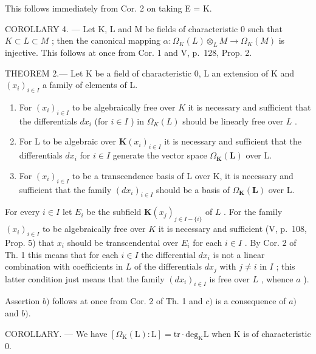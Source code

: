 This follows immediately from Cor. 2 on taking E = K.

COROLLARY 4. --- Let K, L and M be fields of characteristic 0 such that \(K \subset L \subset M\) ; then the canonical mapping \(\alpha: \Omega_{K}(L) \otimes_{L} M \to \Omega_{K}(M)\) is injective. This follows at once from Cor. 1 and V, p.~128, Prop. 2.

THEOREM 2.--- Let K be a field of characteristic 0, L an extension of K and \((x_{i})_{i\in I}\) a family of elements of L.

\begin{enumerate}
\def\labelenumi{\alph{enumi})}
\item
  For \((x_{i})_{i\in I}\) to be algebraically free over \(K\) it is necessary and sufficient that the differentials \(dx_{i}\) (for \(i\in I\) ) in \(\Omega_K(L)\) should be linearly free over \(L\) .
\item
  For L to be algebraic over \(\mathbf{K}(x_{i})_{i\in I}\) it is necessary and sufficient that the differentials \(dx_{i}\) for \(i\in I\) generate the vector space \(\Omega_{\mathbf{K}}(\mathbf{L})\) over L.
\item
  For \((x_{i})_{i\in I}\) to be a transcendence basis of L over K, it is necessary and sufficient that the family \((dx_{i})_{i\in I}\) should be a basis of \(\Omega_{\mathbf{K}}(\mathbf{L})\) over L.
\end{enumerate}

For every \(i \in I\) let \(E_i\) be the subfield \(\mathbf{K}(x_j)_{j \in I - \{i\}}\) of \(L\) . For the family \((x_i)_{i \in I}\) to be algebraically free over \(K\) it is necessary and sufficient (V, p.~108, Prop. 5) that \(x_i\) should be transcendental over \(E_i\) for each \(i \in I\) . By Cor. 2 of Th. 1 this means that for each \(i \in I\) the differential \(dx_i\) is not a linear combination with coefficients in \(L\) of the differentials \(dx_j\) with \(j \neq i\) in \(I\) ; this latter condition just means that the family \((dx_i)_{i \in I}\) is free over \(L\) , whence \(a\) ).

Assertion \(b)\) follows at once from Cor. 2 of Th. 1 and \(c)\) is a consequence of \(a)\) and \(b).\)

COROLLARY. --- We have \([\Omega_{\mathrm{K}}(\mathrm{L}):\mathrm{L}]=\mathrm{tr}\cdot\mathrm{deg}_{\mathrm{K}}\mathrm{L}\) when K is of characteristic 0.

